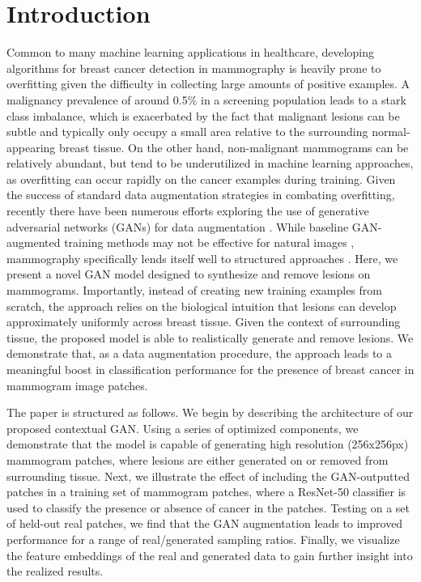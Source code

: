 \documentclass{article}
\begin{document}
\section{Introduction}
Common to many machine learning applications in healthcare, developing algorithms for breast cancer detection in mammography \cite{deephealth_paper, ribli,morrell,lotter,nyu, google_paper, mit_paper, china_paper} is heavily prone to overfitting given the difficulty in collecting large amounts of positive examples.
A malignancy prevalence of around 0.5\% in a screening population leads to a stark class imbalance, which is exacerbated by the fact that malignant lesions can be subtle and typically only occupy a small area relative to the surrounding normal-appearing breast tissue.
On the other hand, non-malignant mammograms can be relatively abundant, but tend to be underutilized in machine learning approaches, as overfitting can occur rapidly on the cancer examples during training.
Given the success of standard data augmentation strategies in combating overfitting, recently there have been numerous efforts exploring the use of generative adversarial networks (GANs) \cite{gan} for data augmentation \cite{gan-aug1,gan-aug2,gan-aug3,gan-aug4,gan-aug5}.
While baseline GAN-augmented training methods may not be effective for natural images \cite{vinyals}, mammography specifically lends itself well to structured approaches \cite{wugan}. 
Here, we present a novel GAN model designed to synthesize and remove lesions on mammograms.
Importantly, instead of creating new training examples from scratch, the approach relies on the biological intuition that lesions can develop approximately uniformly across breast tissue.
Given the context of surrounding tissue, the proposed model is able to realistically generate and remove lesions. 
We demonstrate that, as a data augmentation procedure, the approach leads to a meaningful boost in classification performance for the presence of breast cancer in mammogram image patches. 

The paper is structured as follows. We begin by describing the architecture of our proposed contextual GAN. Using a series of optimized components, we demonstrate that the model is capable of generating high resolution (256x256px) mammogram patches, where lesions are either generated on or removed from surrounding tissue.
Next, we illustrate the effect of including the GAN-outputted patches in a training set of mammogram patches, where a ResNet-50 \cite{resnet} classifier is used to classify the presence or absence of cancer in the patches.
Testing on a set of held-out real patches, we find that the GAN augmentation leads to improved performance for a range of real/generated sampling ratios.
Finally, we visualize the feature embeddings of the real and generated data to gain further insight into the realized results. 
\end{document}

